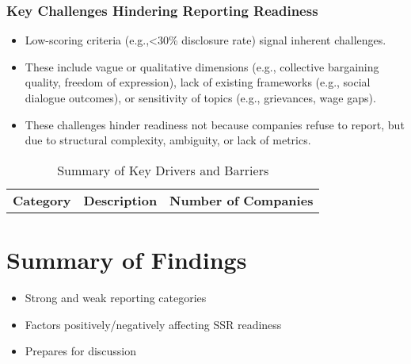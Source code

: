 \subsubsection{Key Challenges Hindering Reporting Readiness}
\begin{itemize}
    \item Low-scoring criteria (e.g.,<30\% disclosure rate) signal inherent challenges.       
    \item These include vague or qualitative dimensions (e.g., collective bargaining quality, freedom of expression), 
    lack of existing frameworks (e.g., social dialogue outcomes), or sensitivity of topics (e.g., grievances, wage gaps). 
     \item These challenges hinder readiness not because companies refuse to report, but due to structural complexity, 
     ambiguity, or lack of metrics.
\end{itemize}

\begin{table}[H]
    \centering
    \caption{Summary of Key Drivers and Barriers}
    \begin{tabular}{l l l}
        \textbf{Category} & \textbf{Description} & \textbf{Number of Companies} \\
    \end{tabular}
\end{table}

\section{Summary of Findings}
\begin{itemize}
    \item Strong and weak reporting categories
    \item Factors positively/negatively affecting SSR readiness
    \item Prepares for discussion
\end{itemize}